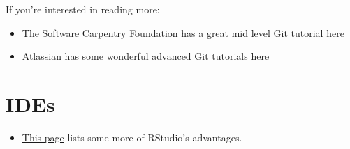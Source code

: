 \documentclass[]{book}
\providecommand{\tightlist}{%
  \setlength{\itemsep}{0pt}\setlength{\parskip}{0pt}}
\begin{document}
If you're interested in reading more:

\begin{itemize}
\tightlist
\item
  The Software Carpentry Foundation has a great mid level Git tutorial
  \href{https://swcarpentry.GitHub.io/git-novice/}{here}
\item
  Atlassian has some wonderful advanced Git tutorials
  \href{https://www.atlassian.com/git/tutorials/advanced-overview}{here}
\end{itemize}

\section{IDEs}\label{ides}

\begin{itemize}
\tightlist
\item
  \href{https://www.theanalysisfactor.com/the-advantages-of-rstudio/}{This
  page} lists some more of RStudio's advantages.
\end{itemize}
\end{document}
